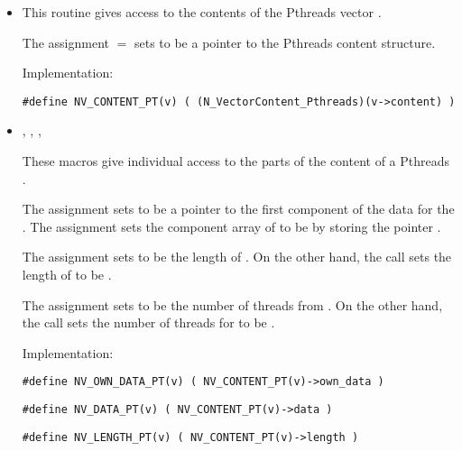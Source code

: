 \begin{itemize}

\item {}                             
    
  This routine gives access to the contents of the Pthreads
  vector .
  
  The assignment  $=$  sets           
   to be a pointer to the Pthreads  content  
  structure.                                             
                                                            
  Implementation: 
  
  \verb|#define NV_CONTENT_PT(v) ( (N_VectorContent_Pthreads)(v->content) )|
  
\item {}, , , 


  These macros give individual access to the parts of    
  the content of a Pthreads .                        
                                                               
  The assignment  sets  to be     
  a pointer to the first component of the data for the  . 
  The assignment  sets the component array of  to     
  be  by storing the pointer .                   
  
  The assignment  sets  to be     
  the length of . On the other hand, the call  
  sets the length of  to be .
                                                            
  The assignment  sets  to be     
  the number of threads from . On the other hand, the call  
  sets the number of threads for  to be .
                                                            
  Implementation: 
  
  \verb|#define NV_OWN_DATA_PT(v) ( NV_CONTENT_PT(v)->own_data )|

  \verb|#define NV_DATA_PT(v) ( NV_CONTENT_PT(v)->data )|
  
  \verb|#define NV_LENGTH_PT(v) ( NV_CONTENT_PT(v)->length )|


\end{itemize}
